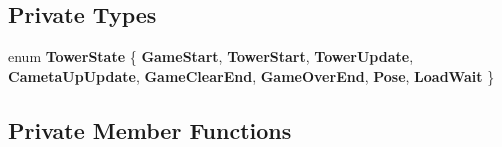 \subsection*{Private Types}
\begin{DoxyCompactItemize}
\item 
\mbox{\label{class_a_l_l_tower_ab65162a24d9a2361ae3eee3119a1df6a}} 
enum {\bfseries Tower\+State} \{ \newline
{\bfseries Game\+Start}, 
{\bfseries Tower\+Start}, 
{\bfseries Tower\+Update}, 
{\bfseries Cameta\+Up\+Update}, 
\newline
{\bfseries Game\+Clear\+End}, 
{\bfseries Game\+Over\+End}, 
{\bfseries Pose}, 
{\bfseries Load\+Wait}
 \}
\end{DoxyCompactItemize}
\subsection*{Private Member Functions}
